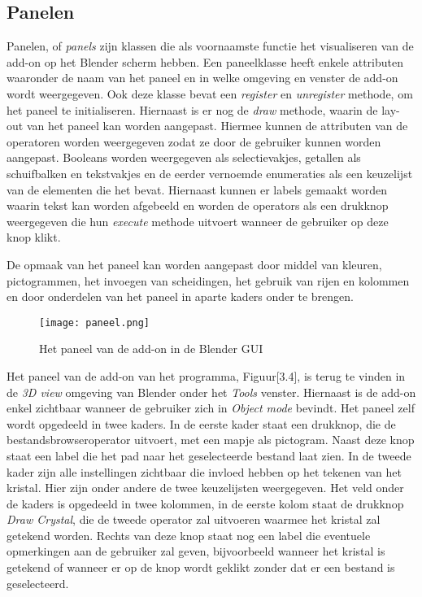 \subsection{Panelen}
Panelen, of \textit{panels} zijn klassen die als voornaamste functie het visualiseren van de add-on op het Blender scherm hebben. Een paneelklasse heeft enkele attributen waaronder de naam van het paneel en in welke omgeving en venster de add-on wordt weergegeven. Ook deze klasse bevat een \textit{register} en \textit{unregister} methode, om het paneel te initialiseren. Hiernaast is er nog de \textit{draw} methode, waarin de lay-out van het paneel kan worden aangepast. Hiermee kunnen de attributen van de operatoren worden weergegeven zodat ze door de gebruiker kunnen worden aangepast. Booleans worden weergegeven als selectievakjes, getallen als schuifbalken en tekstvakjes en de eerder vernoemde enumeraties als een keuzelijst van de elementen die het bevat. Hiernaast kunnen er labels gemaakt worden waarin tekst kan worden afgebeeld en worden de operators als een drukknop weergegeven die hun \textit{execute} methode uitvoert wanneer de gebruiker op deze knop klikt.
\par
De opmaak van het paneel kan worden aangepast door middel van kleuren, pictogrammen, het invoegen van scheidingen, het gebruik van rijen en kolommen en door onderdelen van het paneel in aparte kaders onder te brengen.
\par
\begin{figure}[H]
\begin{center}
\texttt{[image: paneel.png]}
\end{center}
\caption{Het paneel van de add-on in de Blender GUI}
\end{figure}

\newpage
Het paneel van de add-on van het programma, Figuur[3.4], is terug te vinden in de \textit{3D view} omgeving van Blender onder het \textit{Tools} venster. Hiernaast is de add-on enkel zichtbaar wanneer de gebruiker zich in \textit{Object mode} bevindt. Het paneel zelf wordt opgedeeld in twee kaders. In de eerste kader staat een drukknop, die de bestandsbrowseroperator uitvoert, met een mapje als pictogram. Naast deze knop staat een label die het pad naar het geselecteerde bestand laat zien. In de tweede kader zijn alle instellingen zichtbaar die invloed hebben op het tekenen van het kristal. Hier zijn onder andere de twee keuzelijsten weergegeven.  Het veld onder de kaders is opgedeeld in twee kolommen, in de eerste kolom staat de drukknop \textit{Draw Crystal}, die de tweede operator zal uitvoeren waarmee het kristal zal getekend worden. Rechts van deze knop staat nog een label die eventuele opmerkingen aan de gebruiker zal geven, bijvoorbeeld wanneer het kristal is getekend of wanneer er op de knop wordt geklikt zonder dat er een bestand is geselecteerd.




